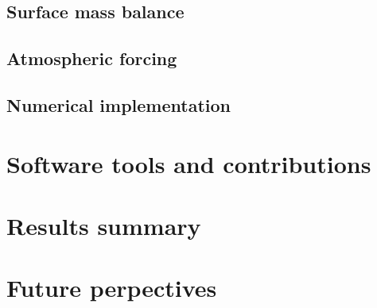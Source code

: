\documentclass{article}
\begin{document}
\subsection{Surface mass balance}
\subsection{Atmospheric forcing}
\subsection{Numerical implementation}




\section{Software tools and contributions}


\section{Results summary}


\section{Future perpectives}

\newcommand{\urlprefix}[0]{}  %



\end{document}
